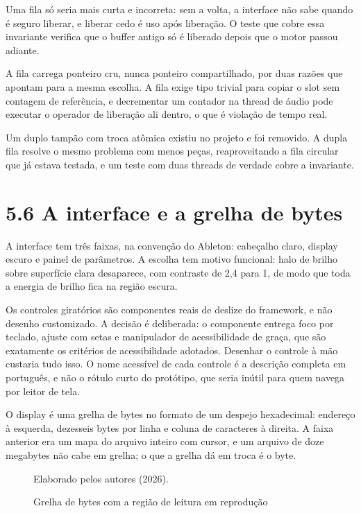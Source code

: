 \documentclass[12pt,a4paper]{article}
\begin{document}
Uma fila só seria mais curta e incorreta: sem a volta, a interface não sabe quando é seguro liberar, e liberar cedo é uso após liberação. O teste que cobre essa invariante verifica que o buffer antigo só é liberado depois que o motor passou adiante.


A fila carrega ponteiro cru, nunca ponteiro compartilhado, por duas razões que apontam para a mesma escolha. A fila exige tipo trivial para copiar o slot sem contagem de referência, e decrementar um contador na thread de áudio pode executar o operador de liberação ali dentro, o que é violação de tempo real.


Um duplo tampão com troca atômica existiu no projeto e foi removido. A dupla fila resolve o mesmo problema com menos peças, reaproveitando a fila circular que já estava testada, e um teste com duas threads de verdade cobre a invariante.


\section*{5.6 A interface e a grelha de bytes}

A interface tem três faixas, na convenção do Ableton: cabeçalho claro, display escuro e painel de parâmetros. A escolha tem motivo funcional: halo de brilho sobre superfície clara desaparece, com contraste de 2,4 para 1, de modo que toda a energia de brilho fica na região escura.


Os controles giratórios são componentes reais de deslize do framework, e não desenho customizado. A decisão é deliberada: o componente entrega foco por teclado, ajuste com setas e manipulador de acessibilidade de graça, que são exatamente os critérios de acessibilidade adotados. Desenhar o controle à mão custaria tudo isso. O nome acessível de cada controle é a descrição completa em português, e não o rótulo curto do protótipo, que seria inútil para quem navega por leitor de tela.


O display é uma grelha de bytes no formato de um despejo hexadecimal: endereço à esquerda, dezesseis bytes por linha e coluna de caracteres à direita. A faixa anterior era um mapa do arquivo inteiro com cursor, e um arquivo de doze megabytes não cabe em grelha; o que a grelha dá em troca é o byte.


\begin{figure}
\centering
\resizebox{\textwidth}{!}{}
\caption{Grelha de bytes com a região de leitura em reprodução}
\label{fig:grelha}
{\footnotesize Elaborado pelos autores (2026).\par}
\end{figure}
\end{document}

